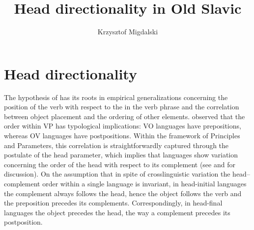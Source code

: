 \documentclass[output=paper,modfonts,newtxmath,hidelinks]{langscibook}
\title{Head directionality in Old Slavic}
\author{Krzysztof Migdalski\affiliation{University of Wrocław}}
\begin{document}
\maketitle


\section{Head directionality}\label{11:s1}

The hypothesis of  has its roots in  empirical generalizations concerning the position of the verb with respect to the  in the verb phrase and the correlation between object placement and the ordering of other elements. \citeauthor{greenberg1963} observed that the order within VP has typological implications: VO languages have prepositions, whereas OV languages have postpositions. Within the framework of Principles and Parameters, this correlation is straightforwardly captured through the postulate of the head parameter, which implies that languages show variation concerning the order of the head with respect to its complement (see \citealt{Vennemann1972} and \citealt{Dryer1992,Dryer2007} for discussion). On the assumption that in spite of crosslinguistic variation the head--complement order within a single language is invariant, in head-initial languages the complement always follows the head, hence the object follows the verb and the preposition precedes its  complements. Correspondingly, in head-final languages the object precedes the  head, the way a  complement precedes its postposition.
\end{document}
